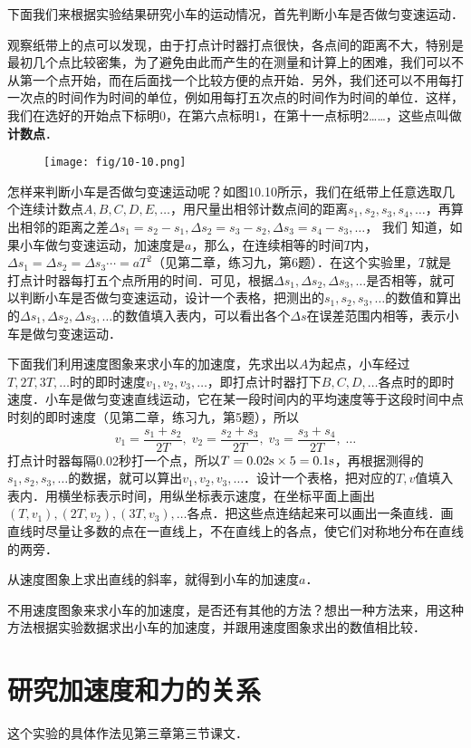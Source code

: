 下面我们来根据实验结果研究小车的运动情况，首先判断小车是否做匀变速运动．

观察纸带上的点可以发现，由于打点计时器打点很快，各点间的距离不大，特别是最初几个点比较密集，为了避免由此而产生的在测量和计算上的困难，我们可以不从第一个点开始，而在后面找一个比较方便的点开始．另外，我们还可以不用每打一次点的时间作为时间的单位，例如用每打五次点的时间作为时间的单位．这样，我们在选好的开始点下标明0，在第六点标明1，在第十一点标明2……，这些点叫做\textbf{计数点}．

\begin{figure}[htp]\centering
    \texttt{[image: fig/10-10.png]}
    \caption{}
    \end{figure}
    

怎样来判断小车是否做匀变速运动呢？如图10.10所示，我们在纸带上任意选取几个连续计数点$A,B,C,D,E,\ldots$，用尺量出相邻计数点间的距离$s_1,s_2,s_3,s_4,\ldots$，再算出相邻的距离之差$\Delta s_1=s_2-s_1, \Delta s_2=s_3-s_2,\Delta s_3=s_4-s_3,\ldots$， 我们	
知道，如果小车做匀变速运动，加速度是$a$，那么，在连续相等的时间$T$内，$\Delta s_1=\Delta s_2=\Delta s_3\cdots=aT^2$（见第二章，练习九，第6题）．在这个实验里，$T$就是打点计时器每打五个点所用的时间．可见，根据$\Delta s_1,\Delta s_2,\Delta s_3,\ldots$是否相等，就可以判断小车是否做匀变速运动，设计一个表格，把测出的$s_1,s_2,s_3,\ldots$的数值和算出的$\Delta s_1,\Delta s_2,\Delta s_3,\ldots$的数值填入表内，可以看出各个$\Delta s$在误差范围内相等，表示小车是做匀变速运动．

下面我们利用速度图象来求小车的加速度，先求出以$A$为起点，小车经过$T,2T,3T,\ldots$时的即时速度$v_1,v_2,v_3,\ldots$，即打点计时器打下$B,C,D,\ldots$各点时的即时速度．小车是做匀变速直线运动，它在某一段时间内的平均速度等于这段时间中点时刻的即时速度（见第二章，练习九，第5题），所以
\[v_1=\frac{s_1+s_2}{2T},\; v_2=\frac{s_2+s_3}{2T},\;v_3=\frac{s_3+s_4}{2T},\; \ldots\]
打点计时器每隔0.02秒打一个点，所以$T=0.02{\rm s}\times 5=0.1{\rm s}$，再根据测得的$s_1,s_2,s_3,\ldots$的数据，就可以算出$v_1,v_2,v_3,\ldots$．设计一个表格，把对应的$T,v$值填入表内．用横坐标表示时间，用纵坐标表示速度，在坐标平面上画出$(T,v_1),(2T,v_2),(3T,v_3),\ldots$各点．把这些点连结起来可以画出一条直线．画直线时尽量让多数的点在一直线上，不在直线上的各点，使它们对称地分布在直线的两旁．

从速度图象上求出直线的斜率，就得到小车的加速度$a$．

不用速度图象来求小车的加速度，是否还有其他的方法？想出一种方法来，用这种方法根据实验数据求出小车的加速度，并跟用速度图象求出的数值相比较．

\section{研究加速度和力的关系}
这个实验的具体作法见第三章第三节课文．

